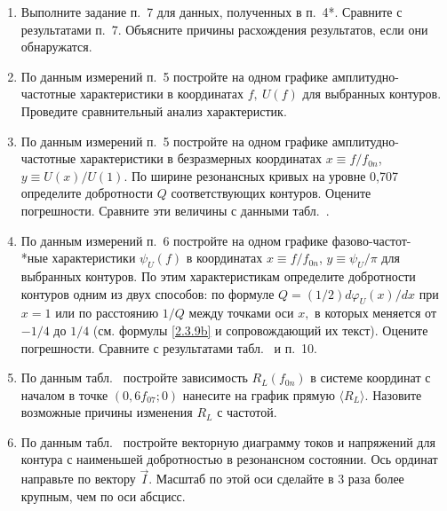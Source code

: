 \begin{lab:task}
\begin{enumerate}
Оцените относительный вклад активных потерь в конденсаторах, представленных в табл.~. сопротивлением $R_{S\text{max}},$ рассчитанным для максимального значения $\tg\delta=10^{-3},$ в суммарное активное сопротивление контура.

\item {} Выполните задание п.~7 для данных, полученных в п.~4*. Сравните с результатами п.~7. Объясните причины расхождения результатов, если они обнаружатся.

\item По данным измерений п.~5 постройте на одном графике амплитудно-частотные характеристики в координатах $f,~U(f)$   для выбранных контуров. Проведите сравнительный анализ характеристик.

\item По данным измерений п.~5 постройте на одном графике амплитудно-частотные характеристики в безразмерных координатах $x\equiv f/f_{0n}$, $y\equiv U(x)/U(1).$ По ширине резонансных кривых на уровне 0,707 определите добротности $Q$ соответствующих контуров. Оцените погрешности. Сравните эти величины с данными табл.~.

\item По данным измерений п.~6 постройте на одном графике фазово-частот-\\*ные характеристики $\psi_U(f)$ в координатах $x\equiv f/f_{0n}$, $y\equiv\psi_U/\pi$ для выбранных контуров. По этим характеристикам определите добротности контуров одним из двух способов: по формуле $Q=(1/2)d\varphi_U(x)/dx$ при $x=1$ или по расстоянию $1/Q$ между точками оси $x,$ в которых  меняется от $-1/4$ до $1/4$ (см. формулы \eqref{2.3.9b} и сопровождающий их текст). Оцените погрешности. Сравните с результатами табл.~ и п.~10.

\item По данным табл.~ постройте зависимость $R_L(f_{0n})$ в системе координат с началом в точке $(0,6f_{07};0)$ нанесите на график прямую $\langle R_L \rangle.$ Назовите возможные причины изменения $R_L$ с частотой.

\item По данным табл.~ постройте векторную диаграмму токов и напряжений для контура с наименьшей добротностью в резонансном состоянии. Ось ординат направьте по вектору $\vec I.$ Масштаб по этой оси  сделайте в 3 раза более крупным, чем по оси абсцисс.
	\end{enumerate}
\end{lab:task}

